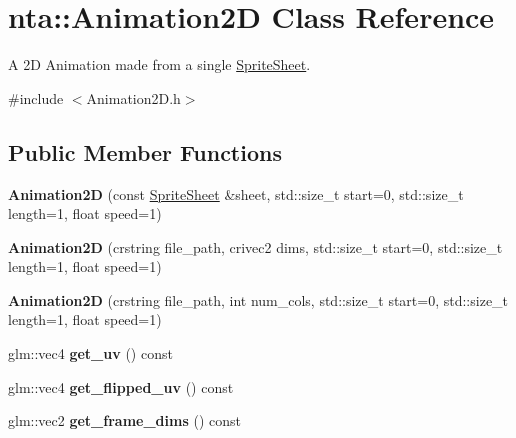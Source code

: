 \hypertarget{classnta_1_1Animation2D}{}\section{nta\+:\+:Animation2D Class Reference}
\label{classnta_1_1Animation2D}


A 2D Animation made from a single \hyperlink{structnta_1_1SpriteSheet}{Sprite\+Sheet}.  




{\ttfamily \#include $<$Animation2\+D.\+h$>$}

\subsection*{Public Member Functions}
\begin{DoxyCompactItemize}
\item 
\mbox{\label{classnta_1_1Animation2D_a792bd9b44d471dc526e89dc9b2b4b7e0}} 
{\bfseries Animation2D} (const \hyperlink{structnta_1_1SpriteSheet}{Sprite\+Sheet} \&sheet, std\+::size\+\_\+t start=0, std\+::size\+\_\+t length=1, float speed=1)
\item 
\mbox{\label{classnta_1_1Animation2D_a914bde6d79c34f2da580c9de07460e51}} 
{\bfseries Animation2D} (crstring file\+\_\+path, crivec2 dims, std\+::size\+\_\+t start=0, std\+::size\+\_\+t length=1, float speed=1)
\item 
\mbox{\label{classnta_1_1Animation2D_af7e829c4535ff57a41cfecbb9313ef7b}} 
{\bfseries Animation2D} (crstring file\+\_\+path, int num\+\_\+cols, std\+::size\+\_\+t start=0, std\+::size\+\_\+t length=1, float speed=1)
\item 
\mbox{\label{classnta_1_1Animation2D_af7373ff1020b685bd583ae63ba24de55}} 
glm\+::vec4 {\bfseries get\+\_\+uv} () const
\item 
\mbox{\label{classnta_1_1Animation2D_aa46a6c17839ad28c1f6b4c04537b237a}} 
glm\+::vec4 {\bfseries get\+\_\+flipped\+\_\+uv} () const
\item 
\mbox{\label{classnta_1_1Animation2D_a1192a17d29aa798e21eed8a93bd0387a}} 
glm\+::vec2 {\bfseries get\+\_\+frame\+\_\+dims} () const

\end{DoxyCompactItemize}
